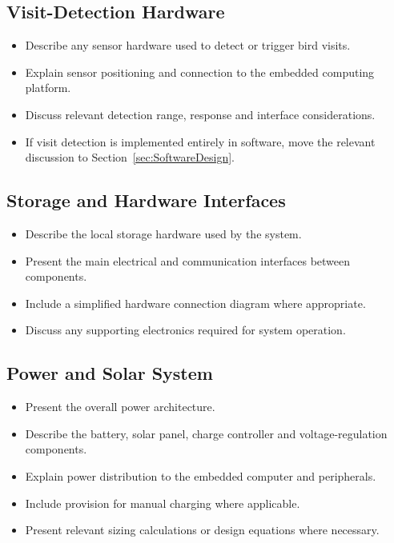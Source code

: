\subsection{Visit-Detection Hardware}
\label{subsec:VisitDetectionHardware}

\begin{itemize}
    \item Describe any sensor hardware used to detect or trigger bird visits.
    \item Explain sensor positioning and connection to the embedded computing platform.
    \item Discuss relevant detection range, response and interface considerations.
    \item If visit detection is implemented entirely in software, move the relevant discussion to Section~\ref{sec:SoftwareDesign}.
\end{itemize}


\subsection{Storage and Hardware Interfaces}
\label{subsec:StorageHardwareInterfaces}

\begin{itemize}
    \item Describe the local storage hardware used by the system.
    \item Present the main electrical and communication interfaces between components.
    \item Include a simplified hardware connection diagram where appropriate.
    \item Discuss any supporting electronics required for system operation.
\end{itemize}


\subsection{Power and Solar System}
\label{subsec:PowerSolarDesign}

\begin{itemize}
    \item Present the overall power architecture.
    \item Describe the battery, solar panel, charge controller and voltage-regulation components.
    \item Explain power distribution to the embedded computer and peripherals.
    \item Include provision for manual charging where applicable.
    \item Present relevant sizing calculations or design equations where necessary.
\end{itemize}


